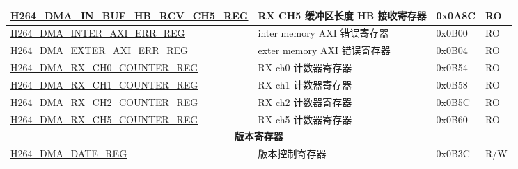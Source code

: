 \begin{longtable}{ | p{7.5cm} | p{5.7cm} | p{1.2cm} | p{1cm} | }
    \hyperref[regdesc:H264DMAINBUFHBRCVCH5REG]{H264\_DMA\_IN\_BUF\_HB\_RCV\_CH5\_REG} & RX CH5  缓冲区长度 HB 接收寄存器 & 0x0A8C & RO \\ \hline
    \hyperref[regdesc:H264DMAINTERAXIERRREG]{H264\_DMA\_INTER\_AXI\_ERR\_REG} & inter memory AXI 错误寄存器 & 0x0B00 & RO \\ \hline
    \hyperref[regdesc:H264DMAEXTERAXIERRREG]{H264\_DMA\_EXTER\_AXI\_ERR\_REG} & exter memory AXI 错误寄存器 & 0x0B04 & RO \\ \hline
    \hyperref[regdesc:H264DMARXCH0COUNTERREG]{H264\_DMA\_RX\_CH0\_COUNTER\_REG} & RX ch0 计数器寄存器 & 0x0B54 & RO \\ \hline
    \hyperref[regdesc:H264DMARXCH1COUNTERREG]{H264\_DMA\_RX\_CH1\_COUNTER\_REG} & RX ch1 计数器寄存器 & 0x0B58 & RO \\ \hline
    \hyperref[regdesc:H264DMARXCH2COUNTERREG]{H264\_DMA\_RX\_CH2\_COUNTER\_REG} & RX ch2 计数器寄存器 & 0x0B5C & RO \\ \hline
    \hyperref[regdesc:H264DMARXCH5COUNTERREG]{H264\_DMA\_RX\_CH5\_COUNTER\_REG} & RX ch5 计数器寄存器 & 0x0B60 & RO \\ \hline

    \multicolumn{4}{|c|}{\textbf{版本寄存器}} \\ \hline
    \hyperref[regdesc:H264DMADATEREG]{H264\_DMA\_DATE\_REG} & 版本控制寄存器 & 0x0B3C & R/W \\ \hline
    \end{longtable}